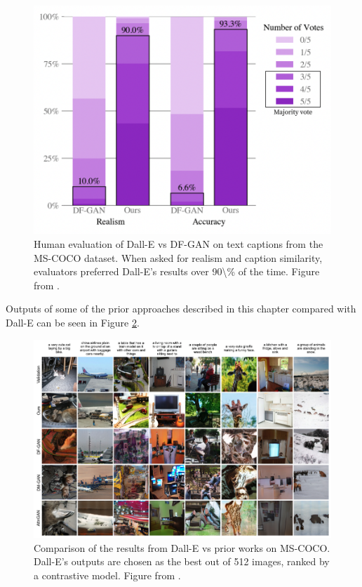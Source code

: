 \documentclass[
]{krantz}
\begin{document}
\begin{figure}

{\centering \includegraphics[width=0.8\linewidth]{figures/02-02-text-2-img/dallephotorealism} 

}

\caption{Human evaluation of Dall-E vs DF-GAN on text captions from the MS-COCO dataset. When asked for realism and caption similarity, evaluators preferred Dall-E's results over 90\textbackslash\% of the time. Figure from \citet{DALLE1}.}\label{fig:dallephotorealism}
\end{figure}



Outputs of some of the prior approaches described in this chapter compared with Dall-E can be seen in Figure \ref{fig:dalleexamples}.

\begin{figure}

{\centering \includegraphics[width=1\linewidth]{figures/02-02-text-2-img/dalleexamples} 

}

\caption{Comparison of the results from Dall-E vs prior works on MS-COCO. Dall-E's outputs are chosen as the best out of 512 images, ranked by a contrastive model. Figure from \citet{DALLE1}.}\label{fig:dalleexamples}
\end{figure}
\end{document}
